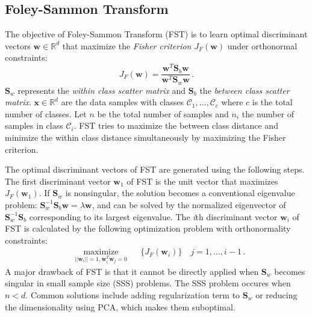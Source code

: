 \documentclass[runningheads]{llncs}
\begin{document}
\subsection{Foley-Sammon Transform}
\label{ssec:FST}
The objective of Foley-Sammon Transform (FST) \cite{sammon:odp,okada:oosda} is to learn optimal discriminant vectors $\mathbf{w} \in \mathbb{R}^{d}$ that maximize the \textit{Fisher criterion} $J_F(\mathbf{w})$ under orthonormal constraints:
\begin{equation}
\label{eqn:FC}
J_F(\mathbf{w})  = \dfrac{\mathbf{w}^T \mathbf{S}_b \mathbf{w}}{\mathbf{w}^T \mathbf{S}_w \mathbf{w}} \,.
\end{equation}
$\mathbf{S}_w$ represents the \textit{within class scatter matrix} and $\mathbf{S}_b$ the \textit{between class scatter matrix}. $\mathbf{x}\in \mathbb{R}^d$ are the data samples with classes $\mathcal{C}_1,\ldots,\mathcal{C}_c$ where $c$ is the total number of classes. Let $n$ be the total number of samples and $n_i$ the number of samples in class $\mathcal{C}_i$. 
FST tries to maximize the between class distance and minimize the within class distance simultaneously by maximizing the Fisher criterion. 


The optimal discriminant vectors of FST are generated using the following steps. The first discriminant vector $\mathbf{w}_{1}$ of FST is the unit vector that maximizes $J_F(\mathbf{w}_1)$. 
\color{black} If $\mathbf{S}_w$ is nonsingular, the solution becomes a conventional eigenvalue problem: $\mathbf{S}_w^{-1} \mathbf{S}_b \mathbf{w} = \lambda  \mathbf{w}$, and can be solved by the normalized eigenvector of $\mathbf{S}_w^{-1} \mathbf{S}_b$ corresponding to its largest eigenvalue. 
 The \textit{i}th discriminant vector $\mathbf{w}_{i}$ of FST is calculated by the following optimization problem with orthonormality constraints:
\begin{equation}
\begin{aligned}
& \underset{||\mathbf{w}_i|| = 1,\mathbf{w}_{i}^T \mathbf{w}_{j} = 0}   {\text{maximize}} & & \{J_F(\mathbf{w}_i)\} \quad j = 1, \ldots, i-1 \,.
\label{eqn:OptFST}
\end{aligned}
\end{equation}
A major drawback of FST is that it cannot be directly applied when $\mathbf{S}_w$ becomes singular in small sample size (SSS) problems. The SSS problem occures when $n<d$.
Common solutions include adding regularization term to $\mathbf{S}_w$ or reducing the dimensionality using PCA, which makes them suboptimal.
\end{document}
